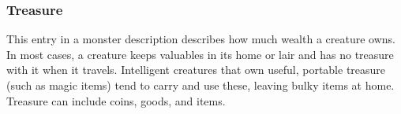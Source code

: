 {\subsubsection{Treasure} This entry in a monster description describes how much wealth a creature owns. In most cases, a creature keeps valuables in its home or lair and has no treasure with it when it travels. Intelligent creatures that own useful, portable treasure (such as magic items) tend to carry and use these, leaving bulky items at home. Treasure can include coins, goods, and items. 
\begin{comment}
Creatures can have varying amounts of each, as follows.
\subparhead{Standard} Refer to the treasure tables and roll d\% once for each type of treasure (Coins, Goods, Items) on the Level section of the table that corresponds to the creature's Challenge Rating (for groups of creatures, use the Encounter Level for the encounter instead). Some creatures have double, triple, or even quadruple standard treasure; in these cases, roll for each type of treasure two, three, or four times.
\subparhead{None} The creature collects no treasure of its own.
\subparhead{Nonstandard} Some creatures have quirks or habits that affect the types of treasure they collect. These creatures use the same
treasure tables, but with special adjustments.
\subparhead{Fractional Coins} Roll on the Coins column in the section corresponding to the creature's Challenge Rating, but divide the result as indicated.
\subparhead{\% Goods or Items} The creature has goods or items only some of the time. Before checking for goods or items, roll d\% against the given percentage. On a success, make a normal roll on the appropriate Goods or Items column (which may still result in no goods or items).
\subparhead{Double Goods or Items} Roll twice on the appropriate Goods or Items column.
\subparhead{Parenthetical Notes} Some entries for goods or items include notes that limit the types of treasure a creature collects.

When a note includes the word ``no,'' it means the creature does not collect or cannot keep that thing. If a random roll generates such a result, treat the result as ``none'' instead. 

When a note includes the word ``only,'' the creature goes out of its way to collect treasure of the indicated type. Treat all results from that column as the indicated type of treasure.
It's sometimes necessary to reroll until the right sort of item appears. 
\end{comment}

}
